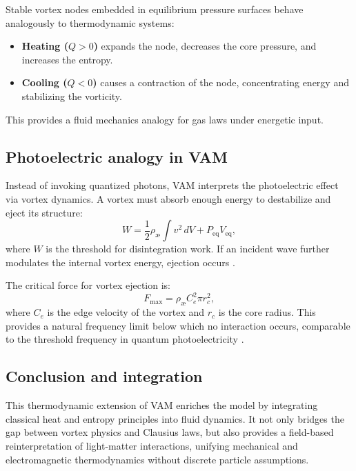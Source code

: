 Stable vortex nodes embedded in equilibrium pressure surfaces behave analogously to thermodynamic systems:
\begin{itemize}
    \item \textbf{Heating ($Q > 0$)} expands the node, decreases the core pressure, and increases the entropy. \item \textbf{Cooling ($Q < 0$)} causes a contraction of the node, concentrating energy and stabilizing the vorticity.
\end{itemize}
This provides a fluid mechanics analogy for gas laws under energetic input.

\subsection{Photoelectric analogy in VAM}

Instead of invoking quantized photons, VAM interprets the photoelectric effect via vortex dynamics. A vortex must absorb enough energy to destabilize and eject its structure:
\begin{equation}
    W = \frac{1}{2} \rho_\text{\ae} \int v^2 \, dV + P_\text{eq} V_\text{eq},\label{eq:photoelectric_work}
\end{equation}
where $W$ is the threshold for disintegration work. If an incident wave further modulates the internal vortex energy, ejection occurs \cite{vam2025unified}.

The critical force for vortex ejection is:
\begin{equation}
    F_{\max} = \rho_\text{\ae} C_e^2 \pi r_c^2,\label{eq:critical_force}
\end{equation}
where $C_e$ is the edge velocity of the vortex and $r_c$ is the core radius. This provides a natural frequency limit below which no interaction occurs, comparable to the threshold frequency in quantum photoelectricity \cite{einstein1905photoelectric}.

\subsection*{Conclusion and integration}

This thermodynamic extension of VAM enriches the model by integrating classical heat and entropy principles into fluid dynamics. It not only bridges the gap between vortex physics and Clausius laws, but also provides a field-based reinterpretation of light-matter interactions, unifying mechanical and electromagnetic thermodynamics without discrete particle assumptions.